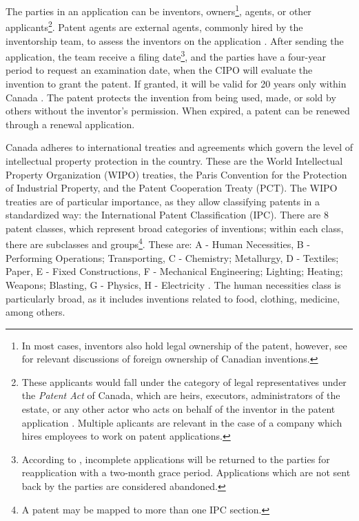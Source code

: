 \documentclass[../main.tex]{subfiles}
\begin{document}
The parties in an application can be inventors, owners\footnote{In most cases, inventors also hold legal ownership of the patent, however, see \textcite{alam_etal22, beaudry_schiffauerova11} for relevant discussions of foreign ownership of Canadian inventions.}, agents, or other applicants\footnote{These applicants would fall under the category of legal representatives under the \textit{Patent Act} of Canada, which are heirs, executors, administrators of the estate, or any other actor who acts on behalf of the inventor in the patent application \parencite{Patent85}. Multiple aplicants are relevant in the case of a company which hires employees to work on patent applications.}. Patent agents are external agents, commonly hired by the inventorship team, to assess the inventors on the application \parencite{putnam06}. After sending the application, the team receive a filing date\footnote{According to \textcite{canadianintellectualpropertyoffice21}, incomplete applications will be returned to the parties for reapplication with a two-month grace period. Applications which are not sent back by the parties are considered abandoned.}, and the parties have a four-year period to request an examination date, when the CIPO will evaluate the invention to grant the patent. If granted, it will be valid for 20 years only within Canada \parencite{abbes_etal22}. The patent protects the invention from being used, made, or sold by others without the inventor's permission. When expired, a patent can be renewed through a renewal application. 

Canada adheres to international treaties and agreements which govern the level of intellectual property protection in the country. These are the World Intellectual Property Organization (WIPO) treaties, the Paris Convention for the Protection of Industrial Property, and the Patent Cooperation Treaty (PCT). The WIPO treaties are of particular importance, as they allow classifying patents in a standardized way: the International Patent Classification (IPC). There are 8 patent classes, which represent broad categories of inventions; within each class, there are subclasses and groups\footnote{A patent may be mapped to more than one IPC section.}. These are: A - Human Necessities, B - Performing Operations; Transporting, C - Chemistry; Metallurgy, D - Textiles; Paper, E - Fixed Constructions, F - Mechanical Engineering; Lighting; Heating; Weapons; Blasting, G - Physics, H - Electricity \parencite{worldintellectualpropertyorganization24}. The human necessities class is particularly broad, as it includes inventions related to food, clothing, medicine, among others. 
 
\end{document}
